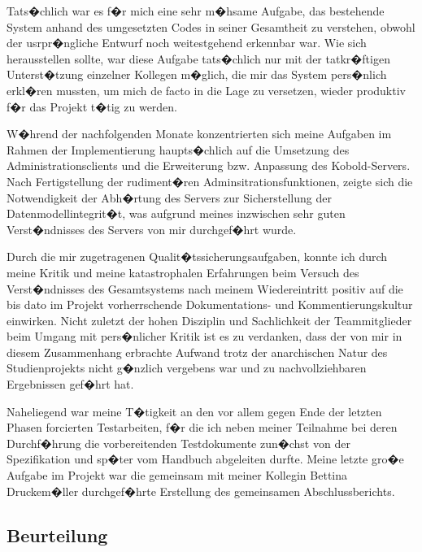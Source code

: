 Tats�chlich war es f�r mich eine sehr m�hsame Aufgabe, das bestehende System anhand des umgesetzten Codes
in seiner Gesamtheit zu verstehen, obwohl der usrpr�ngliche Entwurf noch weitestgehend erkennbar war. Wie
sich herausstellen sollte, war diese Aufgabe tats�chlich nur mit der tatkr�ftigen Unterst�tzung einzelner 
Kollegen m�glich, die mir das System pers�nlich erkl�ren mussten, um mich de facto in die Lage zu versetzen, 
wieder produktiv f�r das Projekt t�tig zu werden.\par

W�hrend der nachfolgenden Monate konzentrierten sich meine Aufgaben im Rahmen der Implementierung haupts�chlich
auf die Umsetzung des Administrationsclients und die Erweiterung bzw. Anpassung des Kobold-Servers. Nach Fertigstellung
der rudiment�ren Adminsitrationsfunktionen, zeigte sich die Notwendigkeit der Abh�rtung des Servers zur Sicherstellung
der Datenmodellintegrit�t, was aufgrund meines inzwischen sehr guten Verst�ndnisses des Servers von mir durchgef�hrt wurde.\par

Durch die mir zugetragenen Qualit�tssicherungsaufgaben, konnte ich durch meine Kritik und meine katastrophalen Erfahrungen 
beim Versuch des Verst�ndnisses des Gesamtsystems nach meinem Wiedereintritt positiv auf die bis dato im Projekt vorherrschende 
Dokumentations- und Kommentierungskultur einwirken. Nicht zuletzt der hohen Disziplin und Sachlichkeit der Teammitglieder beim 
Umgang mit pers�nlicher Kritik ist es zu verdanken, dass der von mir in diesem Zusammenhang erbrachte Aufwand trotz der anarchischen
Natur des Studienprojekts nicht g�nzlich vergebens war und zu nachvollziehbaren Ergebnissen gef�hrt hat.\par

Naheliegend war meine T�tigkeit an den vor allem gegen Ende der letzten Phasen forcierten Testarbeiten, f�r die ich neben meiner 
Teilnahme bei deren Durchf�hrung die vorbereitenden Testdokumente zun�chst von der Spezifikation und sp�ter vom Handbuch abgeleiten 
durfte. Meine letzte gro�e Aufgabe im Projekt war die gemeinsam mit meiner Kollegin Bettina Druckem�ller durchgef�hrte Erstellung des 
gemeinsamen Abschlussberichts.\par

\subsection{Beurteilung}

